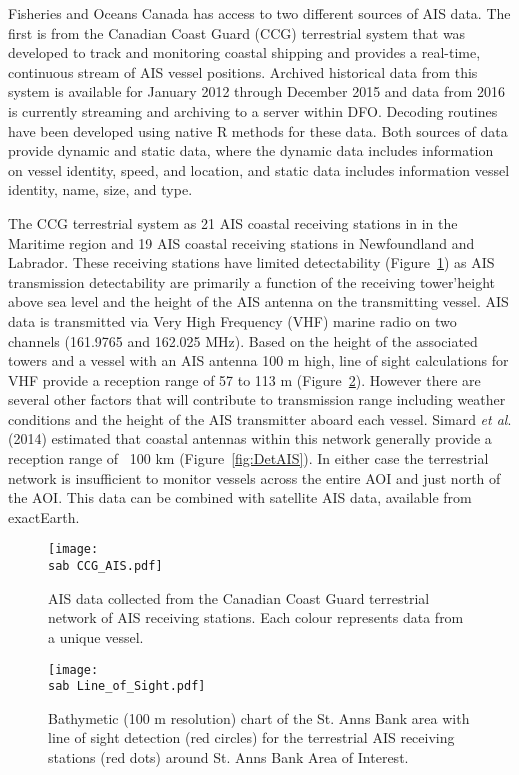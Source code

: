 \documentclass[letterpaper,portrait,11pt]{scrartcl}
\numberwithin{equation}{section}		%
\numberwithin{figure}{section}		%
\numberwithin{table}{section}				%
\newcommand{\ecomod}{\string~/ecomod_data/}   %
\newcommand{\sab}{\ecomod/mpa/sab/}   %
\begin{document}
Fisheries and Oceans Canada has access to two different sources of AIS data.  The first is from the Canadian Coast Guard (CCG) terrestrial system that was developed to track and monitoring coastal shipping and provides a real-time, continuous stream of AIS vessel positions.  Archived historical data from this system is available for January 2012 through December 2015 and data from 2016 is currently streaming and archiving to a server within DFO. Decoding routines have been developed using native R methods for these data.   Both sources of data provide dynamic and static data, where the dynamic data includes information on vessel identity, speed, and location, and static data includes information vessel identity, name, size, and type.   

The CCG terrestrial system as 21 AIS coastal receiving stations in in the Maritime region and 19 AIS coastal receiving stations in Newfoundland and Labrador.  These receiving stations have limited detectability (Figure~\ref{fig:TAIS}) as AIS transmission detectability are primarily a function of the receiving tower\textquoteright height above sea level and the height of the AIS antenna on the transmitting vessel.  AIS data is transmitted via Very High Frequency (VHF) marine radio on two channels (161.9765 and 162.025 MHz).  Based on the height of the associated towers and a vessel with an AIS antenna 100 m high, line of sight calculations for VHF provide a reception range of  57 to 113 m (Figure~\ref{fig:LOF}).  However there are several other factors that will contribute to transmission range including weather conditions and the height of the AIS transmitter aboard each vessel.  Simard \textit{et al}. (2014) estimated that coastal antennas within this network generally provide a reception range of ~100 km (Figure~\ref{fig:DetAIS}).  In either case the terrestrial network is insufficient to monitor vessels across the entire AOI and just north of the AOI. This data can be combined with satellite AIS data, available from exactEarth.


\begin{figure}[h]
	\label{fig:TAIS}
  \centering
	\texttt{[image: \\sab CCG\_AIS.pdf]}
	\caption{AIS data collected from the Canadian Coast Guard terrestrial network of AIS receiving stations.  Each colour represents data from a unique vessel.}
\end{figure}


\begin{figure}[h]
	\label{fig:LOF}
	\centering
	\texttt{[image: \\sab Line\_of\_Sight.pdf]}
	\caption{Bathymetic (100 m resolution) chart of the  St. Anns Bank area with line of sight detection (red circles) for the terrestrial AIS receiving stations (red dots) around St. Anns Bank Area of Interest.}
\end{figure}
\end{document}
